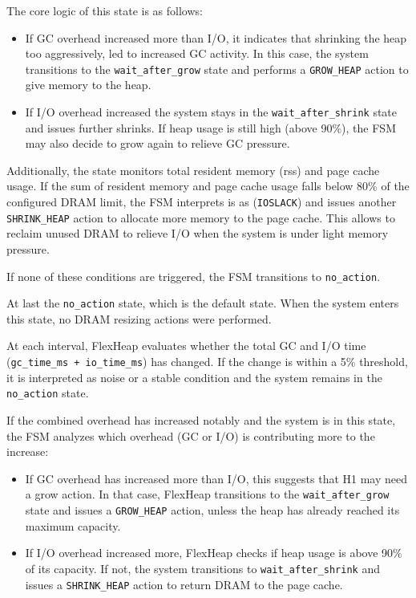 The core logic of this state is as follows:
\begin{itemize}
  
  \item 
  If GC overhead increased more than I/O, it indicates that shrinking the heap too aggressively,
  led to increased GC activity. In this case, the system transitions to the \texttt{wait\_after\_grow} state
  and performs a \texttt{GROW\_HEAP} action to give memory to the heap.
  
  \item If I/O overhead increased  the system stays in the \texttt{wait\_after\_shrink} state and issues further shrinks.
  If heap usage is still high (above 90\%), the FSM may also decide to grow again to relieve GC pressure.
\end{itemize}

Additionally, the state monitors total resident memory (rss) and page cache usage.
If the sum of resident memory and page cache usage falls below 80\% 
of the configured DRAM limit, the FSM interprets is as (\texttt{IOSLACK}) and 
issues another \texttt{SHRINK\_HEAP} action to allocate more memory to the page cache. This allows 
to reclaim unused DRAM to relieve I/O when the system is under light memory pressure.

If none of these conditions are triggered, the FSM 
transitions to \texttt{no\_action}.

At last the \texttt{no\_action} state, which is the default state.
When the system enters this state, no DRAM resizing actions were performed.

At each interval, FlexHeap evaluates whether the total GC and I/O time (\texttt{gc\_time\_ms + io\_time\_ms}) has
changed. If the change is within a 5\% threshold, it is interpreted 
as noise or a stable condition and the system remains in the \texttt{no\_action} state.

If the combined overhead has increased notably and the system is in this state, the FSM analyzes which overhead (GC or I/O) is 
contributing more to the increase:
\begin{itemize}
  \item If GC overhead has increased more than I/O, this suggests that H1 may need a grow action. 
  In that case, FlexHeap transitions to the \texttt{wait\_after\_grow} state and issues a \texttt{GROW\_HEAP} action, 
  unless the heap has already reached its maximum capacity.

  \item If I/O overhead increased more, FlexHeap checks if heap usage is above 90\% of 
  its capacity. If not, the system transitions to \texttt{wait\_after\_shrink} and issues a \texttt{SHRINK\_HEAP} 
  action to return DRAM to the page cache.
\end{itemize}

